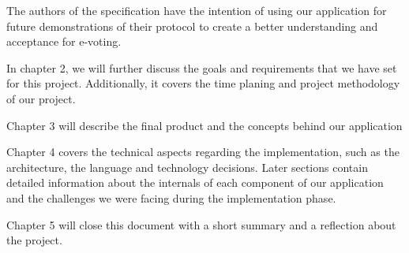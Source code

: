 The authors of the specification have the intention of using our application for future demonstrations of their protocol to create a better understanding and acceptance for e-voting.

In chapter 2, we will further discuss the goals and requirements that we have set for this project. Additionally, it covers the time planing and project methodology of our project.

Chapter 3 will describe the final product and the concepts behind our application

Chapter 4 covers the technical aspects regarding the implementation, such as the architecture, the language and technology decisions. Later sections contain detailed information about the internals of each component of our application and the challenges we were facing during the implementation phase. 

Chapter 5 will close this document with a short summary and a reflection about the project.